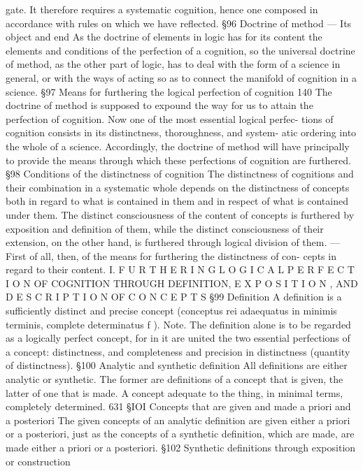 {gate. It therefore requires a systematic cognition, hence one composed in
accordance with rules on which we have reflected.
§96
Doctrine of method — Its object and end
As the doctrine of elements in logic has for its content the elements and
conditions of the perfection of a cognition, so the universal doctrine of
method, as the other part of logic, has to deal with the form of a science in
general, or with the ways of acting so as to connect the manifold of
cognition in a science.
§97
Means for furthering the logical perfection of cognition
140
The doctrine of method is supposed to expound the way for us to attain
the perfection of cognition. Now one of the most essential logical perfec-
tions of cognition consists in its distinctness, thoroughness, and system-
atic ordering into the whole of a science. Accordingly, the doctrine of
method will have principally to provide the means through which these
perfections of cognition are furthered.
§98
Conditions of the distinctness of cognition
The distinctness of cognitions and their combination in a systematic
whole depends on the distinctness of concepts both in regard to what is
contained in them and in respect of what is contained under them.
The distinct consciousness of the content of concepts is furthered by
exposition and definition of them, while the distinct consciousness of their
extension, on the other hand, is furthered through logical division of them.
— First of all, then, of the means for furthering the distinctness of con-
cepts in regard to their content.
I. F U R T H E R I N G L O G I C A L P E R F E C T I O N OF
COGNITION THROUGH DEFINITION,
E X P O S I T I O N , AND D E S C R I P T I O N OF C O N C E P T S
§99
Definition
A definition is a sufficiently distinct and precise concept (conceptus rei
adaequatus in minimis terminis, complete determinatus f ).
Note.
The definition alone is to be regarded as a logically perfect concept, for in
it are united the two essential perfections of a concept: distinctness, and
completeness and precision in distinctness (quantity of distinctness).
§100
Analytic and synthetic definition
All definitions are either analytic or synthetic. The former are definitions
of a concept that is given, the latter of one that is made.
A concept adequate to the thing, in minimal terms, completely determined.
631
§IOI
Concepts that are given and made a priori and a posteriori
The given concepts of an analytic definition are given either a priori or a
posteriori, just as the concepts of a synthetic definition, which are made,
are made either a priori or a posteriori.
§102
Synthetic definitions through exposition or construction
}

